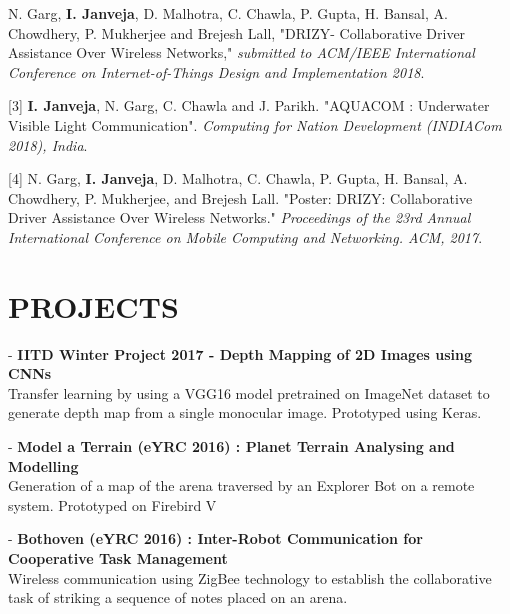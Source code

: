 \documentclass[margin, 10pt]{res} %
\begin{document}
\begin{resume}
[2] N. Garg, {\bf I. Janveja}, D. Malhotra, C. Chawla, P. Gupta, H. Bansal, A. Chowdhery, P. Mukherjee and Brejesh
Lall, "DRIZY- Collaborative Driver Assistance Over Wireless Networks," \textit{submitted to ACM/IEEE International Conference on Internet-of-Things Design and Implementation 2018}.

[3] {\bf I. Janveja}, N. Garg, C. Chawla and J. Parikh. "AQUACOM : Underwater Visible Light Communication". \textit{Computing for Nation Development (INDIACom 2018), India}.

[4] N. Garg, {\bf I. Janveja}, D. Malhotra, C. Chawla, P. Gupta, H. Bansal, A. Chowdhery, P. Mukherjee, and Brejesh Lall. "Poster: DRIZY: Collaborative Driver Assistance Over Wireless Networks." \textit{Proceedings of the 23rd Annual International Conference on Mobile Computing and Networking. ACM, 2017}.



\section{PROJECTS}
- {\bf IITD Winter Project 2017 - Depth Mapping of 2D Images using CNNs}\\
Transfer learning by using a VGG16 model pretrained on ImageNet dataset to generate depth map from a single monocular image. Prototyped using Keras.   


- {\bf Model a Terrain (eYRC 2016) : Planet Terrain Analysing and Modelling} \\
Generation of a map of the arena traversed by an Explorer Bot on a remote system. Prototyped on Firebird V 

- {\bf Bothoven (eYRC 2016) : Inter-Robot Communication for Cooperative Task Management} \\ Wireless communication using ZigBee technology to establish the collaborative task of striking a sequence of notes placed on an arena. 


\end{resume}
\end{document}
